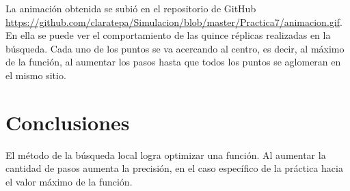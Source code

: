 \documentclass{article}
\begin{document}
La animaci\'on obtenida  se subi\'o en el repositorio de GitHub \url{https://github.com/claratepa/Simulacion/blob/master/Practica7/animacion.gif}.  En ella se puede ver el comportamiento de las quince r\'eplicas realizadas en la b\'usqueda.  Cada uno de los puntos se va acercando al centro, es decir, al m\'aximo de la funci\'on, al aumentar los pasos hasta que todos los puntos se aglomeran en el mismo sitio.




\section{Conclusiones}\label{con}   

El m\'etodo de la b\'usqueda local logra optimizar una funci\'on.  Al aumentar la cantidad de pasos aumenta la precisi\'on, en el caso espec\'ifico de la pr\'actica hacia el valor m\'aximo de la funci\'on.  

\printbibliography
\end{document}
